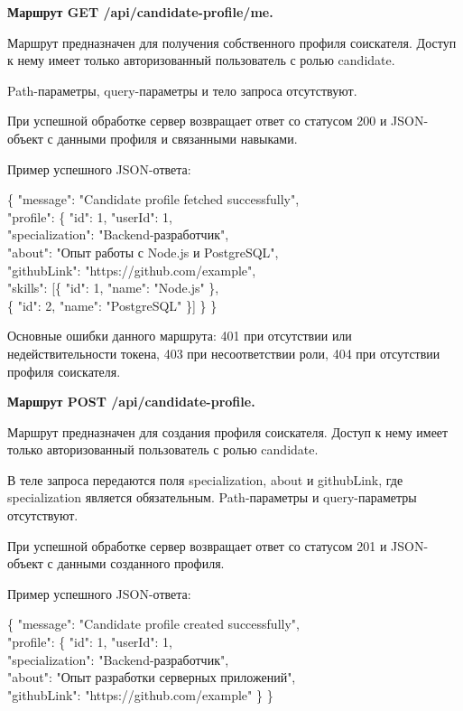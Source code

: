 \textbf{Маршрут GET /api/candidate-profile/me.}

Маршрут предназначен для получения собственного профиля соискателя. Доступ к нему имеет только авторизованный пользователь с ролью candidate.

Path-параметры, query-параметры и тело запроса отсутствуют.

При успешной обработке сервер возвращает ответ со статусом 200 и JSON-объект с данными профиля и связанными навыками.

Пример успешного JSON-ответа:

\begin{flushleft}
	\small\ttfamily
	\{ "message": "Candidate profile fetched successfully",\\
	"profile": \{ "id": 1, "userId": 1,\\
	"specialization": "Backend-разработчик",\\
	"about": "Опыт работы с Node.js и PostgreSQL",\\
	"githubLink": "https://github.com/example",\\
	"skills": [\{ "id": 1, "name": "Node.js" \},\\
	\{ "id": 2, "name": "PostgreSQL" \}] \} \}
\end{flushleft}

Основные ошибки данного маршрута: 401 при отсутствии или недействительности токена, 403 при несоответствии роли, 404 при отсутствии профиля соискателя.

\textbf{Маршрут POST /api/candidate-profile.}

Маршрут предназначен для создания профиля соискателя. Доступ к нему имеет только авторизованный пользователь с ролью candidate.

В теле запроса передаются поля specialization, about и githubLink, где specialization является обязательным. Path-параметры и query-параметры отсутствуют.

При успешной обработке сервер возвращает ответ со статусом 201 и JSON-объект с данными созданного профиля.

Пример успешного JSON-ответа:

\begin{flushleft}
	\small\ttfamily
	\{ "message": "Candidate profile created successfully",\\
	"profile": \{ "id": 1, "userId": 1,\\
	"specialization": "Backend-разработчик",\\
	"about": "Опыт разработки серверных приложений",\\
	"githubLink": "https://github.com/example" \} \}
\end{flushleft}

